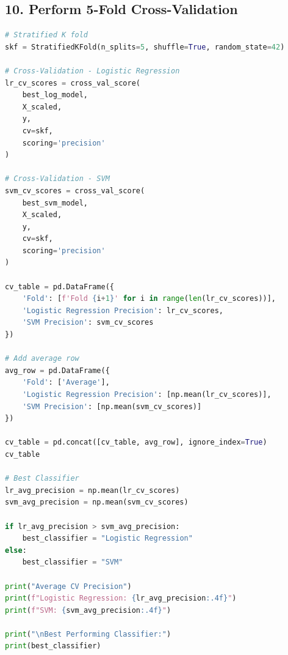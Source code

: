 \documentclass[11pt]{article}
\begin{document}
\subsection*{10. Perform 5-Fold Cross-Validation}
\begin{lstlisting}[language=Python]
# Stratified K fold
skf = StratifiedKFold(n_splits=5, shuffle=True, random_state=42)

# Cross-Validation - Logistic Regression
lr_cv_scores = cross_val_score(
    best_log_model,
    X_scaled,
    y,
    cv=skf,
    scoring='precision'
)

# Cross-Validation - SVM
svm_cv_scores = cross_val_score(
    best_svm_model,
    X_scaled,
    y,
    cv=skf,
    scoring='precision'
)

cv_table = pd.DataFrame({
    'Fold': [f'Fold {i+1}' for i in range(len(lr_cv_scores))],
    'Logistic Regression Precision': lr_cv_scores,
    'SVM Precision': svm_cv_scores
})

# Add average row
avg_row = pd.DataFrame({
    'Fold': ['Average'],
    'Logistic Regression Precision': [np.mean(lr_cv_scores)],
    'SVM Precision': [np.mean(svm_cv_scores)]
})

cv_table = pd.concat([cv_table, avg_row], ignore_index=True)
cv_table

# Best Classifier
lr_avg_precision = np.mean(lr_cv_scores)
svm_avg_precision = np.mean(svm_cv_scores)

if lr_avg_precision > svm_avg_precision:
    best_classifier = "Logistic Regression"
else:
    best_classifier = "SVM"

print("Average CV Precision")
print(f"Logistic Regression: {lr_avg_precision:.4f}")
print(f"SVM: {svm_avg_precision:.4f}")

print("\nBest Performing Classifier:")
print(best_classifier)
\end{lstlisting}
\end{document}
